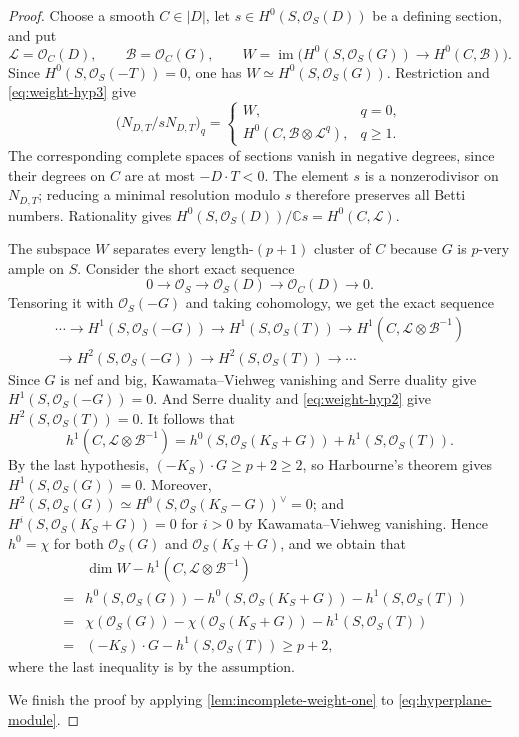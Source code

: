 \documentclass[11pt,reqno]{amsart}
\numberwithin{equation}{section}
\theoremstyle{remark}
\newcommand{\sshf}[1]{\mathcal{O}_{#1}}
\newcommand{\shf}[1]{\mathscr{#1}}
\newcommand{\ses}[3]{0\rightarrow#1\rightarrow#2\rightarrow#3\rightarrow{0}}
\begin{document}
\begin{proof}
Choose a smooth \(C\in|D|\), let \(s\in H^0(S, \sshf{S}(D))\) be a defining section, and put
\[
 \shf{L}=\sshf{C}(D),\qquad \shf{B}=\sshf{C}(G),\qquad
 W=\operatorname{im}\bigl(H^0(S,\sshf{S}(G))
 \longrightarrow H^0(C,\shf{B})\bigr).
\]
Since \(H^0(S,\sshf{S}(-T))=0\), one has
\(W\simeq H^0(S,\sshf{S}(G))\).
Restriction and \eqref{eq:weight-hyp3} give
\begin{equation}\label{eq:hyperplane-module}
 \bigl(N_{D,T}/sN_{D,T}\bigr)_q=
 \begin{cases}
 W,&q=0,\\
 H^0(C,\shf{B}\otimes\shf{L}^{q}),&q\geq1.
 \end{cases}
\end{equation}
The corresponding complete spaces of sections vanish in negative
degrees, since their degrees on \(C\) are at most \(-D\cdot T<0\).
The element \(s\) is a nonzerodivisor on \(N_{D,T}\); reducing a
minimal resolution modulo \(s\) therefore preserves all Betti
numbers. Rationality gives
\(H^0(S,\sshf{S}(D))/\mathbb{C} s=H^0(C,\shf{L})\).

The subspace \(W\) separates every length-\((p+1)\) cluster of \(C\)
because \(G\) is \(p\)-very ample on \(S\). Consider the short exact sequence
\[\ses{\sshf{S}}{\sshf{S}(D)}{\sshf{C}(D)}.\]
Tensoring it with $\sshf{S}(-G)$ and taking cohomology, we get the exact sequence
\[
\begin{gathered}
\cdots\rightarrow H^1(S, \sshf{S}(-G))\rightarrow H^1(S, \sshf{S}(T))
\rightarrow H^1(C, \shf{L}\otimes\shf{B}^{-1})\\
\rightarrow H^2(S, \sshf{S}(-G))\rightarrow H^2(S, \sshf{S}(T))\rightarrow \cdots
\end{gathered}
\]
Since \(G\) is nef and big, Kawamata--Viehweg vanishing and Serre duality give $H^1(S, \sshf{S}(-G))=0$. And Serre duality and \eqref{eq:weight-hyp2} give $H^2(S, \sshf{S}(T))=0$. It follows that
\[
 h^1(C,\shf{L}\otimes\shf{B}^{-1})
 =h^0(S,\sshf{S}(K_S+G))+h^1(S,\sshf{S}(T)).
\]
By the last hypothesis, \((-K_S)\cdot G\geq p+2\geq2\), so Harbourne's theorem gives \(H^1(S,\sshf{S}(G))=0\). Moreover, \(H^2(S,\sshf{S}(G))\simeq H^0(S,\sshf{S}(K_S-G))^\vee=0\); and \(H^i(S,\sshf{S}(K_S+G))=0\) for \(i>0\) by Kawamata--Viehweg vanishing. Hence \(h^0=\chi\) for both \(\sshf{S}(G)\) and \(\sshf{S}(K_S+G)\), and we obtain that
\begin{eqnarray*}
 &&\dim W-h^1(C,\shf{L}\otimes\shf{B}^{-1})\\
 &=&h^0(S,\sshf{S}(G))-h^0(S,\sshf{S}(K_S+G))
   -h^1(S,\sshf{S}(T))\\
 &=& \chi(\sshf{S}(G))-\chi(\sshf{S}(K_S+G))-h^1(S,\sshf{S}(T))\\
 &=&(-K_S)\cdot G-h^1(S,\sshf{S}(T))\geq p+2,
\end{eqnarray*}
where the last inequality is by the assumption.

We finish the proof by applying \cref{lem:incomplete-weight-one} to \eqref{eq:hyperplane-module}.
\end{proof}
\end{document}

